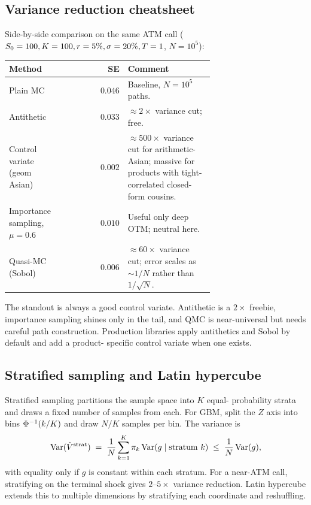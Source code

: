 \subsection{Variance reduction cheatsheet}

Side-by-side comparison on the same ATM call ($S_0=100, K=100,
r=5\%, \sigma=20\%, T=1$, $N = 10^5$):

\begin{center}
\small
\renewcommand{\arraystretch}{1.15}
\begin{tabular}{p{0.26\linewidth} | r | p{0.42\linewidth}}
\toprule
\textbf{Method} & \textbf{SE} & \textbf{Comment} \\
\midrule
Plain MC           & $0.046$
  & Baseline, $N=10^5$ paths. \\
Antithetic         & $0.033$
  & $\approx 2\times$ variance cut; free. \\
Control variate (geom Asian) & $0.002$
  & $\approx 500\times$ variance cut for arithmetic-Asian; massive for products with tight-correlated closed-form cousins. \\
Importance sampling, $\mu=0.6$  & $0.010$
  & Useful only deep OTM; neutral here. \\
Quasi-MC (Sobol)   & $0.006$
  & $\approx 60\times$ variance cut; error scales as $\sim 1/N$ rather than $1/\sqrt N$. \\
\bottomrule
\end{tabular}
\end{center}

The standout is always a good control variate.  Antithetic is a
$2\times$ freebie, importance sampling shines only in the tail, and
QMC is near-universal but needs careful path construction.  Production
libraries apply antithetics and Sobol by default and add a product-
specific control variate when one exists.

\subsection{Stratified sampling and Latin hypercube}

Stratified sampling partitions the sample space into $K$ equal-
probability strata and draws a fixed number of samples from each.
For GBM, split the $Z$ axis into bins $\Phi^{-1}(k/K)$ and draw
$N/K$ samples per bin.  The variance is
\begin{equation}
  \operatorname{Var}(\hat V^{\mathrm{strat}})
  \;=\; \frac{1}{N} \sum_{k=1}^K \pi_k \operatorname{Var}(g \mid \text{stratum } k)
  \;\leq\; \frac{1}{N} \operatorname{Var}(g),
\end{equation}
with equality only if $g$ is constant within each stratum.  For a
near-ATM call, stratifying on the terminal shock gives $2$--$5\times$
variance reduction.  Latin hypercube extends this to multiple
dimensions by stratifying each coordinate and reshuffling.

